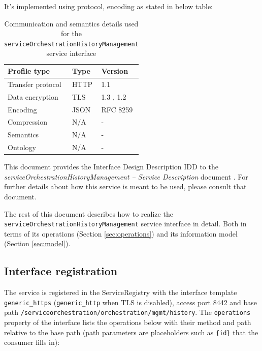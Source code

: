 \documentclass[a4paper]{arrowhead}
\begin{document}
It's implemented using protocol, encoding as stated in below table:
\begin{table}[ht!]
  \centering
  \begin{tabular}{|l|l|l|}
    \hline
    \rowcolor{gray!33} Profile type & Type & Version \\ \hline
    Transfer protocol & HTTP & 1.1 \cite{rfc9112} \\ \hline
    Data encryption & TLS & 1.3 \cite{rfc8446}, 1.2 \cite{rfc5246} \\ \hline
    Encoding & JSON & RFC 8259 \cite{rfc8259} \\ \hline
    Compression & N/A & - \\ \hline
    Semantics & N/A & - \\ \hline
    Ontology & N/A & - \\ \hline
  \end{tabular}
  \caption{Communication and semantics details used for the \texttt{service\allowbreak{}Orchestration\allowbreak{}History\allowbreak{}Management} service interface}
  \label{tab:comunication_semantics_profile}
\end{table}

This document provides the Interface Design Description IDD to the \textit{serviceOrchestrationHistoryManagement -- Service Description} document \cite{ssso-serviceOrchestrationHistoryManagement-sd}.
For further details about how this service is meant to be used, please consult that document.

The rest of this document describes how to realize the \texttt{service\allowbreak{}Orchestration\allowbreak{}History\allowbreak{}Management} service
interface in detail. Both in terms of its operations (Section \ref{sec:operations}) and its information model (Section \ref{sec:model}).

\subsection{Interface registration}

The service is registered in the ServiceRegistry with the interface template \texttt{generic\_\allowbreak{}https} (\texttt{generic\_\allowbreak{}http} when TLS is disabled), access port 8442 and base path \texttt{/\allowbreak{}serviceorchestration/\allowbreak{}orchestration/\allowbreak{}mgmt/\allowbreak{}history}. The \texttt{operations} property of the interface lists the operations below with their method and path relative to the base path (path parameters are placeholders such as \texttt{\{id\}} that the consumer fills in):
\end{document}
